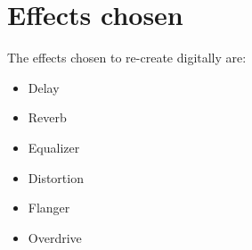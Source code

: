 \section{Effects chosen}\label{sec:effects_chosen}
The effects chosen to re-create digitally are:

\begin{itemize}
	\item Delay
	\item Reverb
	\item Equalizer
	\item Distortion
	\item Flanger
	\item Overdrive
\end{itemize}